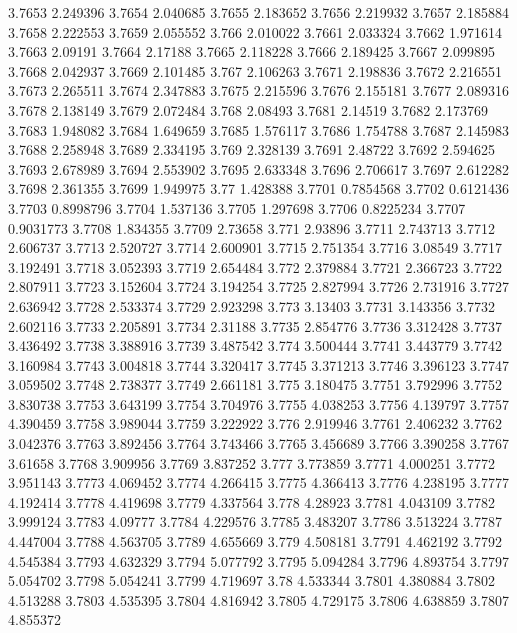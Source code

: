 3.7653  2.249396
3.7654  2.040685
3.7655  2.183652
3.7656  2.219932
3.7657  2.185884
3.7658  2.222553
3.7659  2.055552
3.766  2.010022
3.7661  2.033324
3.7662  1.971614
3.7663  2.09191
3.7664  2.17188
3.7665  2.118228
3.7666  2.189425
3.7667  2.099895
3.7668  2.042937
3.7669  2.101485
3.767  2.106263
3.7671  2.198836
3.7672  2.216551
3.7673  2.265511
3.7674  2.347883
3.7675  2.215596
3.7676  2.155181
3.7677  2.089316
3.7678  2.138149
3.7679  2.072484
3.768  2.08493
3.7681  2.14519
3.7682  2.173769
3.7683  1.948082
3.7684  1.649659
3.7685  1.576117
3.7686  1.754788
3.7687  2.145983
3.7688  2.258948
3.7689  2.334195
3.769  2.328139
3.7691  2.48722
3.7692  2.594625
3.7693  2.678989
3.7694  2.553902
3.7695  2.633348
3.7696  2.706617
3.7697  2.612282
3.7698  2.361355
3.7699  1.949975
3.77  1.428388
3.7701  0.7854568
3.7702  0.6121436
3.7703  0.8998796
3.7704  1.537136
3.7705  1.297698
3.7706  0.8225234
3.7707  0.9031773
3.7708  1.834355
3.7709  2.73658
3.771  2.93896
3.7711  2.743713
3.7712  2.606737
3.7713  2.520727
3.7714  2.600901
3.7715  2.751354
3.7716  3.08549
3.7717  3.192491
3.7718  3.052393
3.7719  2.654484
3.772  2.379884
3.7721  2.366723
3.7722  2.807911
3.7723  3.152604
3.7724  3.194254
3.7725  2.827994
3.7726  2.731916
3.7727  2.636942
3.7728  2.533374
3.7729  2.923298
3.773  3.13403
3.7731  3.143356
3.7732  2.602116
3.7733  2.205891
3.7734  2.31188
3.7735  2.854776
3.7736  3.312428
3.7737  3.436492
3.7738  3.388916
3.7739  3.487542
3.774  3.500444
3.7741  3.443779
3.7742  3.160984
3.7743  3.004818
3.7744  3.320417
3.7745  3.371213
3.7746  3.396123
3.7747  3.059502
3.7748  2.738377
3.7749  2.661181
3.775  3.180475
3.7751  3.792996
3.7752  3.830738
3.7753  3.643199
3.7754  3.704976
3.7755  4.038253
3.7756  4.139797
3.7757  4.390459
3.7758  3.989044
3.7759  3.222922
3.776  2.919946
3.7761  2.406232
3.7762  3.042376
3.7763  3.892456
3.7764  3.743466
3.7765  3.456689
3.7766  3.390258
3.7767  3.61658
3.7768  3.909956
3.7769  3.837252
3.777  3.773859
3.7771  4.000251
3.7772  3.951143
3.7773  4.069452
3.7774  4.266415
3.7775  4.366413
3.7776  4.238195
3.7777  4.192414
3.7778  4.419698
3.7779  4.337564
3.778  4.28923
3.7781  4.043109
3.7782  3.999124
3.7783  4.09777
3.7784  4.229576
3.7785  3.483207
3.7786  3.513224
3.7787  4.447004
3.7788  4.563705
3.7789  4.655669
3.779  4.508181
3.7791  4.462192
3.7792  4.545384
3.7793  4.632329
3.7794  5.077792
3.7795  5.094284
3.7796  4.893754
3.7797  5.054702
3.7798  5.054241
3.7799  4.719697
3.78  4.533344
3.7801  4.380884
3.7802  4.513288
3.7803  4.535395
3.7804  4.816942
3.7805  4.729175
3.7806  4.638859
3.7807  4.855372
